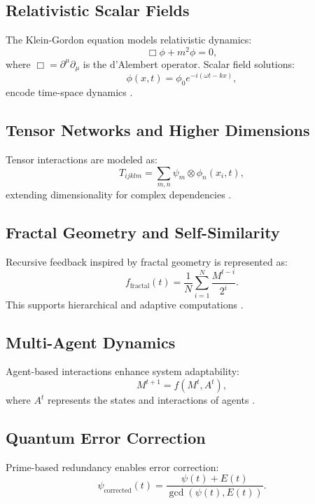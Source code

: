 \documentclass{article}
\theoremstyle{plain}
\begin{document}
\subsection{Relativistic Scalar Fields}
The Klein-Gordon equation models relativistic dynamics:
\begin{equation}
\Box \phi + m^2 \phi = 0,
\end{equation}
where \( \Box = \partial^\mu \partial_\mu \) is the d'Alembert operator. Scalar field solutions:
\begin{equation}
\phi(x, t) = \phi_0 e^{-i (\omega t - kx)},
\end{equation}
encode time-space dynamics \cite{kleingordon2023}.

\subsection{Tensor Networks and Higher Dimensions}
Tensor interactions are modeled as:
\begin{equation}
T_{ijklm} = \sum_{m,n} \psi_m \otimes \phi_n(x_i, t),
\end{equation}
extending dimensionality for complex dependencies \cite{tensor2023}.

\subsection{Fractal Geometry and Self-Similarity}
Recursive feedback inspired by fractal geometry is represented as:
\begin{equation}
f_{\text{fractal}}(t) = \frac{1}{N} \sum_{i=1}^N \frac{M^{t-i}}{2^i}.
\end{equation}
This supports hierarchical and adaptive computations \cite{fractals2021}.

\subsection{Multi-Agent Dynamics}
Agent-based interactions enhance system adaptability:
\begin{equation}
M^{t+1} = f(M^t, A^t),
\end{equation}
where \( A^t \) represents the states and interactions of agents \cite{multiagent2022}.

\subsection{Quantum Error Correction}
Prime-based redundancy enables error correction:
\begin{equation}
\psi_{\text{corrected}}(t) = \frac{\psi(t) + E(t)}{\gcd(\psi(t), E(t))}.
\end{equation}
\end{document}
